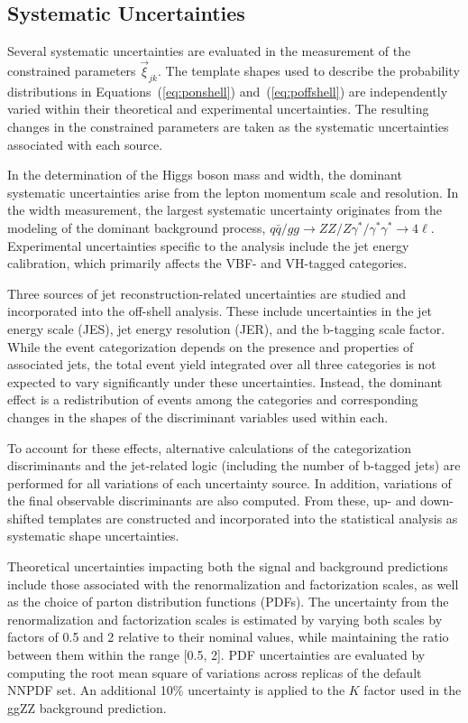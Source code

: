 \subsection{Systematic Uncertainties}

Several systematic uncertainties are evaluated in the measurement of the constrained parameters $\vec{\xi}_{jk}$. The template shapes used to describe the probability distributions in Equations~(\ref{eq:ponshell}) and~(\ref{eq:poffshell}) are independently varied within their theoretical and experimental uncertainties. The resulting changes in the constrained parameters are taken as the systematic uncertainties associated with each source.

In the \onshell determination of the Higgs boson mass and width, the dominant systematic uncertainties arise from the lepton momentum scale and resolution. In the \offshell width measurement, the largest systematic uncertainty originates from the modeling of the dominant background process, $q\bar{q}/gg \to ZZ/Z\gamma^*/\gamma^*\gamma^* \to 4\ell$. Experimental uncertainties specific to the \offshell analysis include the jet energy calibration, which primarily affects the VBF- and VH-tagged categories.

Three sources of jet reconstruction-related uncertainties are studied and incorporated into the off-shell analysis. These include uncertainties in the jet energy scale (JES), jet energy resolution (JER), and the b-tagging scale factor. While the event categorization depends on the presence and properties of associated jets, the total event yield integrated over all three categories is not expected to vary significantly under these uncertainties. Instead, the dominant effect is a redistribution of events among the categories and corresponding changes in the shapes of the discriminant variables used within each.

To account for these effects, alternative calculations of the categorization discriminants and the jet-related logic (including the number of b-tagged jets) are performed for all variations of each uncertainty source. In addition, variations of the final observable discriminants are also computed. From these, up- and down-shifted templates are constructed and incorporated into the statistical analysis as systematic shape uncertainties.

Theoretical uncertainties impacting both the signal and background predictions include those associated with the renormalization and factorization scales, as well as the choice of parton distribution functions (PDFs). The uncertainty from the renormalization and factorization scales is estimated by varying both scales by factors of 0.5 and 2 relative to their nominal values, while maintaining the ratio between them within the range [0.5, 2]. PDF uncertainties are evaluated by computing the root mean square of variations across replicas of the default NNPDF set. An additional 10\% uncertainty is applied to the $K$ factor used in the ggZZ background prediction.

